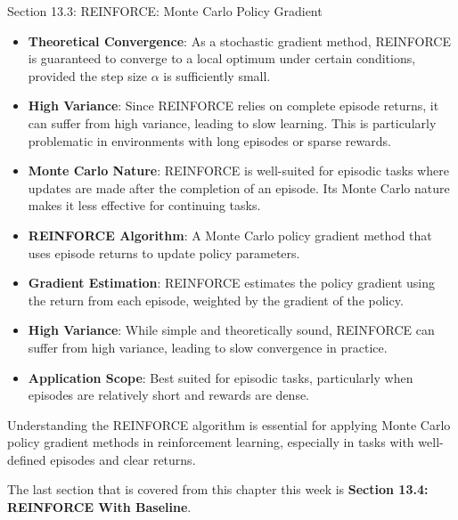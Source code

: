 \begin{notes}{Section 13.3: REINFORCE: Monte Carlo Policy Gradient}
\begin{highlight}
        \begin{itemize}
            \item \textbf{Theoretical Convergence}: As a stochastic gradient method, REINFORCE is guaranteed to converge to a local optimum under certain conditions, provided the step size $\alpha$ is 
            sufficiently small.
            \item \textbf{High Variance}: Since REINFORCE relies on complete episode returns, it can suffer from high variance, leading to slow learning. This is particularly problematic in environments 
            with long episodes or sparse rewards.
            \item \textbf{Monte Carlo Nature}: REINFORCE is well-suited for episodic tasks where updates are made after the completion of an episode. Its Monte Carlo nature makes it less effective for 
            continuing tasks.
        \end{itemize}
    
    \end{highlight}
    
    \begin{highlight}
    
        \begin{itemize}
            \item \textbf{REINFORCE Algorithm}: A Monte Carlo policy gradient method that uses episode returns to update policy parameters.
            \item \textbf{Gradient Estimation}: REINFORCE estimates the policy gradient using the return from each episode, weighted by the gradient of the policy.
            \item \textbf{High Variance}: While simple and theoretically sound, REINFORCE can suffer from high variance, leading to slow convergence in practice.
            \item \textbf{Application Scope}: Best suited for episodic tasks, particularly when episodes are relatively short and rewards are dense.
        \end{itemize}
    
        Understanding the REINFORCE algorithm is essential for applying Monte Carlo policy gradient methods in reinforcement learning, especially in tasks with well-defined episodes and clear returns.
    
    \end{highlight}
\end{notes}

The last section that is covered from this chapter this week is \textbf{Section 13.4: REINFORCE With Baseline}.

